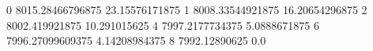 0 8015.28466796875 23.15576171875
1 8008.33544921875 16.20654296875
2 8002.419921875 10.291015625
4 7997.2177734375 5.0888671875
6 7996.27099609375 4.14208984375
8 7992.12890625 0.0
